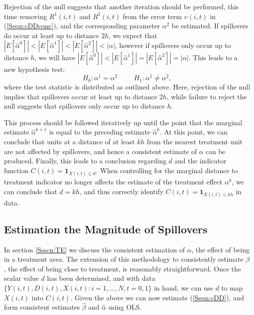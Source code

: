 Rejection of the null suggests that another iteration should be performed, this 
time removing $R^1(i,t)$ and $R^2(i,t)$ from the error term $\upsilon(i,t)$ in 
(\ref{Seqn:cDDconc}), and the corresponding parameter $\alpha^2$ be estimated.  
If spillovers do occur at least up to distance $2h$, we expect that 
$|E[\hat\alpha^0]|<|E[\hat\alpha^1]|<|E[\hat\alpha^2]|<|\alpha|$, however if 
spillovers only occur up to distance $h$, we will have 
$|E[\hat\alpha^0]|<|E[\hat\alpha^1]|=|E[\hat\alpha^2]|=|\alpha|$.  This leads 
to a new hypothesis test:
\[
H_0: \alpha^1=\alpha^2 \hspace{1cm}
H_1: \alpha^1\neq\alpha^2,
\]
where the test statistic is distributed as outlined above.  Here, rejection of 
the null implies that spillovers occur at least up to distance $2h$, while 
failure to reject the null suggests that spillovers only occur up to distance 
$h$.

This process should be followed iteratively up until the point that the marginal 
estimate $\hat\alpha^{k+1}$ is equal to the preceding estimate $\hat\alpha^{k}$.  
At this point, we can conclude that units at a distance of at least $kh$ from 
the nearest treatment unit are not affected by spillovers, and hence a 
consistent estimate of $\alpha$ can be produced. Finally, this leads to a 
conclusion regarding $d$ and the indicator function $C(i,t)=\mathbf{1}_{X(i,t)
\leq d}$.  When controlling for the marginal distance to treatment indicator no 
longer affects the estimate of the treatment effect $\alpha^k$, we can conclude 
that $d=kh$, and thus correctly identify $C(i,t)=\mathbf{1}_{X(i,t)\leq kh}$ in 
data.


\subsection{Estimation the Magnitude of Spillovers}
\label{Ssscn:SE}
In section \ref{Ssscn:TE} we discuss the consistent estimation of $\alpha$, the
effect of being in a treatment area.  The extension of this methodology to 
consistently estimate $\beta$, the effect of being close to treatment, is 
reasonably straightforward.  Once the scalar value $d$ has been determined, and
with data $\{Y(i,t), D(i,t), X(i,t): i=1, \ldots, N, t=0, 1\}$ in hand, we can 
use $d$ to map $X(i,t)$ into $C(i,t)$. Given the above we can now estimate 
(\ref{Seqn:cDD}), and form consistent estimates $\hat\beta$ and $\hat\alpha$ 
using OLS.

